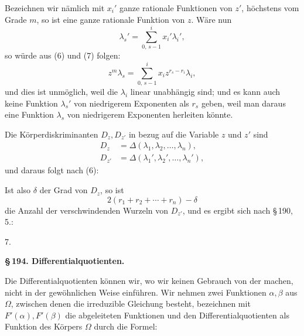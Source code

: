 Bezeichnen wir nämlich mit $x_i'$ ganze rationale Funktionen von $z'$, höchstens vom Grade $m$, so ist
eine ganze rationale Funktion von $z$. Wäre nun
\[
\lambda_s' = \sum_{0,\,s-1}^{i} x_i'\lambda_i',
\]
so würde aus (6) und (7) folgen:
\[
z^m\lambda_s = \sum_{0,\,s-1}^{i} x_i z^{r_s-r_i}\lambda_i,
\]
und dies ist unmöglich, weil die $\lambda_i$ linear unabhängig sind; und es kann auch keine Funktion $\lambda_s'$ von niedrigerem Exponenten als $r_s$ geben, weil man daraus eine Funktion $\lambda_s$ von niedrigerem Exponenten herleiten könnte.

Die Körperdiskriminanten $D_z, D_{z'}$ in bezug auf die Variable $z$ und $z'$ sind
\[
\begin{aligned}
D_z &= \Delta(\lambda_1, \lambda_2, \ldots, \lambda_n), \\
D_{z'} &= \Delta(\lambda_1', \lambda_2', \ldots, \lambda_n'),
\end{aligned}
\]
und daraus folgt nach (6):

Ist also $\delta$ der Grad von $D_z$, so ist
\[
2(r_1+r_2+\cdots+r_n) - \delta
\]
die Anzahl der verschwindenden Wurzeln von $D_{z'}$, und es ergibt sich nach \S\,190, 5.:

7. 

\begin{center}
\textbf{\S\,194. Differentialquotienten.}
\end{center}

Die Differentialquotienten können wir, wo wir keinen Gebrauch von der  machen, nicht in der gewöhnlichen Weise einführen. Wir nehmen zwei Funktionen $\alpha, \beta$ aus $\Omega$, zwischen denen die irreduzible Gleichung
besteht, bezeichnen mit $F'(\alpha), F'(\beta)$ die abgeleiteten Funktionen und  den Differentialquotienten als Funktion des Körpers $\Omega$ durch die Formel:
